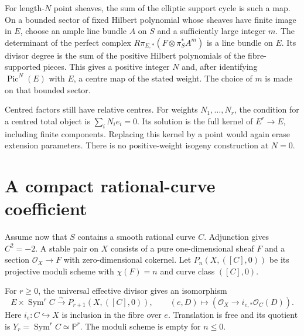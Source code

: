 For length-$N$ point sheaves, the sum of the elliptic support
cycle is such a map. On a bounded sector of fixed Hilbert
polynomial whose sheaves have finite image in $E$, choose an ample line bundle
$A$ on $S$ and a sufficiently large integer $m$.
The determinant of the perfect complex
$R\pi_{E,*}(F\otimes\pi_S^*A^m)$ is a line bundle on $E$.
Its divisor degree is the sum of the positive Hilbert
polynomials of the fibre-supported pieces. This gives a
positive integer $N$ and, after identifying $\operatorname{Pic}^N(E)$
with $E$, a centre map of the stated weight. The choice of
$m$ is made on that bounded sector.

Centred factors still have relative centres. For weights
$N_1,\ldots,N_r$, the condition for a centred total object
is $\sum_iN_ie_i=0$. Its solution is the full kernel of
$E^r\to E$, including finite components. Replacing this
kernel by a point would again erase extension parameters.
There is no positive-weight isogeny construction at $N=0$.

\section{A compact rational-curve coefficient}
\label{cycompact:sec:rational-curve}

Assume now that $S$ contains a smooth rational curve $C$.
Adjunction gives $C^2=-2$. A stable pair on $X$ consists of a
pure one-dimensional sheaf $F$ and a section
$\mathcal O_X\to F$ with zero-dimensional cokernel. Let
$P_n(X,([C],0))$ be its projective moduli scheme with
$\chi(F)=n$ and curve class $([C],0)$.

\begin{theorem}\label{cycompact:thm:rational-pairs}
For $r\geq0$, the universal effective divisor gives an
isomorphism
\[
 E\times\operatorname{Sym}^r C\xrightarrow{\sim}
 P_{r+1}(X,([C],0)),\qquad
 (e,D)\longmapsto
 (\mathcal O_X\longrightarrow i_{e,*}\mathcal O_C(D)).
\]
Here $i_e:C\hookrightarrow X$ is inclusion in the fibre over
$e$. Translation is free and its quotient is
$Y_r=\operatorname{Sym}^rC\simeq\mathbb P^r$.
The moduli scheme is empty for $n\leq0$.
\end{theorem}

